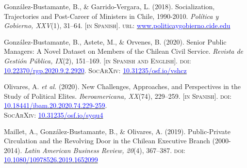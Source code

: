 \begin{publications}
\begin{benumerate}{7}
\item{\small Gonz\'alez-Bustamante, B., \& Garrido-Vergara, L. (2018). Socialization, Trajectories and Post-Career of Ministers in Chile, 1990-2010. {\itshape Pol\'itica y Gobierno, XXV}(1), 31--64. {\footnotesize \scshape [in Spanish]}. {\scshape url}: \href{http://www.politicaygobierno.cide.edu/index.php/pyg/article/view/1080}{\textcolor{blue}{www.politicaygobierno.cide.edu}}}\vspace{1mm}

\end{benumerate}

\end{publications}


\begin{publications}

\begin{benumerate}{8}

\item{\small González-Bustamante, B., Astete, M., \& Orvenes, B. (2020). Senior Public Managers: A Novel Dataset on Members of the Chilean Civil Service. {\itshape Revista de Gestión Pública, IX}(2), 151--169. {\footnotesize \scshape [in Spanish and English]}. {\scshape doi}: \href{https://doi.org/10.22370/rgp.2020.9.2.2920}{\textcolor{blue}{10.22370/rgp.2020.9.2.2920}}. {\scshape \footnotesize SocArXiv}: \href{https://doi.org/10.31235/osf.io/vshcz}{\textcolor{blue}{10.31235/osf.io/vshcz}}}\vspace{1mm}

\item{\small Olivares, A. {\itshape et al.} (2020). New Challenges, Approaches, and Perspectives in the Study of Political Elites. {\itshape Iberoamericana, XX}(74), 229--259. {\footnotesize \scshape [in Spanish]}. {\scshape doi}: \href{https://doi.org/10.18441/ibam.20.2020.74.229-259}{\textcolor{blue}{10.18441/ibam.20.2020.74.229-259}}. \\{\scshape \footnotesize SocArXiv}: \href{https://doi.org/10.31235/osf.io/syqu4}{\textcolor{blue}{10.31235/osf.io/syqu4}}}\vspace{1mm}

\item{\small Maillet, A., Gonz\'alez-Bustamante, B., \& Olivares, A. (2019). Public-Private Circulation and the Revolving Door in the Chilean Executive Branch (2000-2014). {\itshape Latin American Business Review, 20}(4), 367--387. {\scshape doi}: \href{https://doi.org/10.1080/10978526.2019.1652099}{\textcolor{blue}{10.1080/10978526.2019.1652099}}}\vspace{1mm}


\end{benumerate}
\end{publications}
